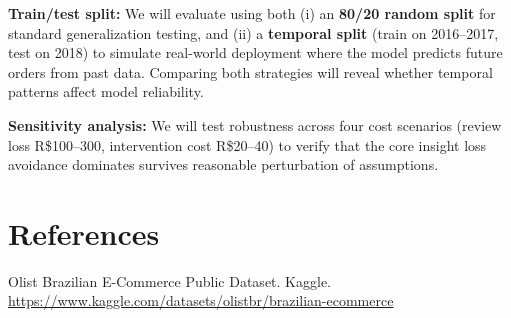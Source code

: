 \documentclass[11pt,a4paper]{article}
\begin{document}
\textbf{Train/test split:} We will evaluate using both (i) an \textbf{80/20 random split} for standard generalization testing, and (ii) a \textbf{temporal split} (train on 2016--2017, test on 2018) to simulate real-world deployment where the model predicts future orders from past data. Comparing both strategies will reveal whether temporal patterns affect model reliability.

\textbf{Sensitivity analysis:} We will test robustness across four cost scenarios (review loss R\$100--300, intervention cost R\$20--40) to verify that the core insight loss avoidance dominates survives reasonable perturbation of assumptions.

\section*{References}
\begin{enumerate}[label={[\arabic*]},noitemsep]
    \item Olist Brazilian E-Commerce Public Dataset. Kaggle. \url{https://www.kaggle.com/datasets/olistbr/brazilian-ecommerce}
\end{enumerate}
\end{document}

